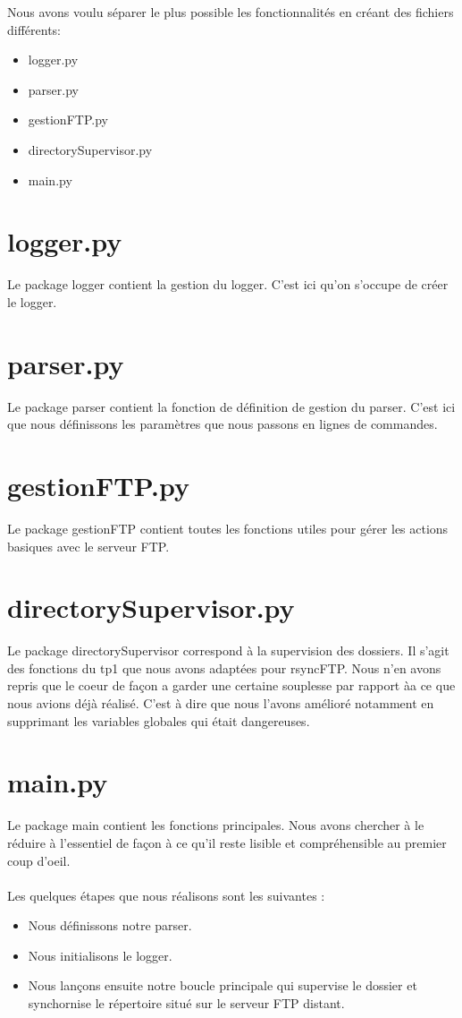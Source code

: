 Nous avons voulu séparer le plus possible les fonctionnalités en créant des fichiers différents: 
\begin{itemize}
\item logger.py
\item parser.py
\item gestionFTP.py
\item directorySupervisor.py
\item main.py
\end{itemize}

\section{logger.py}	

Le package logger contient la gestion du logger. C'est ici qu'on s'occupe de créer le logger.

\section{parser.py}

Le package parser contient la fonction de définition de gestion du parser. 
C'est ici que nous définissons les paramètres que nous passons en lignes de commandes.

\section{gestionFTP.py}

Le package gestionFTP contient toutes les fonctions utiles pour gérer les actions basiques avec le serveur FTP.

\section{directorySupervisor.py}

Le package directorySupervisor correspond à la supervision des dossiers. 
Il s'agit des fonctions du tp1 que nous avons adaptées pour rsyncFTP. 
Nous n'en avons repris que le coeur de façon a garder une certaine souplesse par rapport àa ce que nous avions déjà réalisé.
C'est à dire que nous l'avons amélioré notamment en supprimant les variables globales qui était dangereuses.

\section{main.py}

Le package main contient les fonctions principales. 
Nous avons chercher à le réduire à l'essentiel de façon à ce qu'il reste lisible et compréhensible au premier coup d'oeil.\\
\\
Les quelques étapes que nous réalisons sont les suivantes :
\begin{itemize}
\item Nous définissons notre parser.
\item Nous initialisons le logger.
\item Nous lançons ensuite notre boucle principale qui supervise le dossier et synchornise le répertoire situé sur le serveur FTP distant.
\end{itemize}
